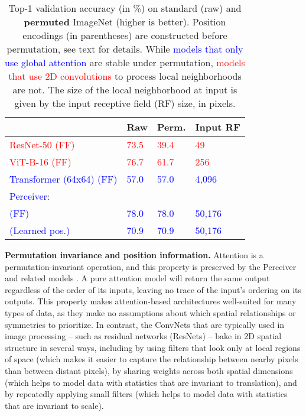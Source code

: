 \documentclass{article}
\begin{document}
\begin{table}[t]
\centering
\begin{tabular}{|l|l|l||l|}
\hline
                                      & Raw           & Perm.         & Input RF   \\ \hline
\textcolor{red}{ResNet-50 (FF)}       & \textcolor{red}{73.5}          & \textcolor{red}{39.4}          &  \textcolor{red}{49}  \\ 
\textcolor{red}{ViT-B-16 (FF)}                         & \textcolor{red}{76.7}          & \textcolor{red}{61.7}          &  \textcolor{red}{256}  \\  \hline
\textcolor{blue}{Transformer (64x64) (FF)}               & \textcolor{blue}{57.0}          & \textcolor{blue}{57.0}          &  \textcolor{blue}{4,096}  \\
\textcolor{blue}{Perceiver}:                            &               &               & \\
\hspace{1em} \textcolor{blue}{(FF)}                      & \textcolor{blue}{78.0}          & \textcolor{blue}{78.0}          & \textcolor{blue}{50,176} \\
\hspace{1em} \textcolor{blue}{(Learned pos.)}            & \textcolor{blue}{70.9}          & \textcolor{blue}{70.9}          & \textcolor{blue}{50,176} \\ \hline
\end{tabular}
\vspace{-8pt}
\caption{Top-1 validation accuracy (in \%) on standard (raw) and \textbf{permuted} ImageNet (higher is better). Position encodings (in parentheses) are constructed before permutation, see text for details. While \textcolor{blue}{models that only use global attention} are stable under permutation, \textcolor{red}{models that use 2D convolutions} to process local neighborhoods are not. The size of the local neighborhood at input is given by the input receptive field (RF) size, in pixels.}
\label{tab:imagenet_permuted}
\vspace{-15pt}
\end{table}

\noindent \textbf{Permutation invariance and position information.} Attention is a permutation-invariant operation, and this property is preserved by the Perceiver and related models \cite{lee2019set}. A pure attention model will return the same output regardless of the order of its inputs, leaving no trace of the input's ordering on its outputs. This property makes attention-based architectures well-suited for many types of data, as they make no assumptions about which spatial relationships or symmetries to prioritize. In contrast, the ConvNets that are typically used in image processing -- such as residual networks (ResNets) \cite{he2016deep} -- bake in 2D spatial structure in several ways, including by using filters that look only at local regions of space (which makes it easier to capture the relationship between nearby pixels than between distant pixels), by sharing weights across both spatial dimensions (which helps to model data with statistics that are invariant to translation), and by repeatedly applying small filters (which helps to model data with statistics that are invariant to scale).
\end{document}
